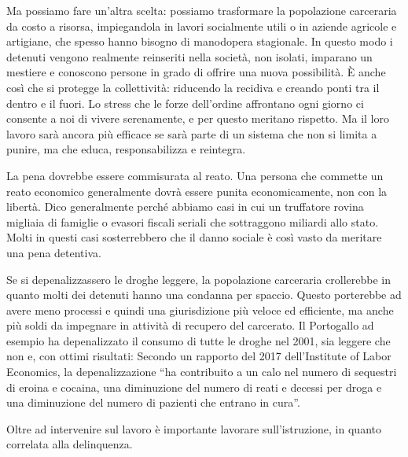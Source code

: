 \documentclass[12pt]{book} %
\begin{document}
Ma possiamo fare un’altra scelta: possiamo trasformare la popolazione carceraria da costo a risorsa, impiegandola in lavori socialmente utili o in aziende agricole e artigiane, che spesso hanno bisogno di manodopera stagionale. In questo modo i detenuti vengono realmente reinseriti nella società, non isolati, imparano un mestiere e conoscono persone in grado di offrire una nuova possibilità.
È anche così che si protegge la collettività: riducendo la recidiva e creando ponti tra il dentro e il fuori. Lo stress che le forze dell’ordine affrontano ogni giorno ci consente a noi di vivere serenamente, e per questo meritano rispetto. Ma il loro lavoro sarà ancora più efficace se sarà parte di un sistema che non si limita a punire, ma che educa, responsabilizza e reintegra.

La pena dovrebbe essere commisurata al reato. Una persona
che commette un reato economico generalmente dovrà essere punita economicamente, non con la libertà.
Dico generalmente perché abbiamo casi in cui un truffatore rovina migliaia di famiglie o evasori fiscali seriali che sottraggono miliardi allo stato. Molti in questi casi sosterrebbero che il danno sociale è così vasto da meritare una pena detentiva.

Se si depenalizzassero le droghe leggere, la popolazione carceraria crollerebbe in quanto molti dei detenuti
hanno una condanna per spaccio. Questo porterebbe ad avere meno processi e quindi una giurisdizione più veloce ed efficiente,
ma anche più soldi da impegnare in attività di recupero del carcerato. Il Portogallo ad esempio ha depenalizzato il
consumo di tutte le droghe nel 2001, sia leggere che non e, con ottimi risultati: Secondo un rapporto del 2017
dell'Institute of Labor
Economics, la depenalizzazione “ha contribuito a un calo nel numero di sequestri di eroina e cocaina, una diminuzione del
numero di reati e decessi per droga e una diminuzione del numero di pazienti che entrano in cura”. 

Oltre ad intervenire sul lavoro è importante lavorare sull'istruzione, in quanto correlata alla delinquenza.
\end{document}
